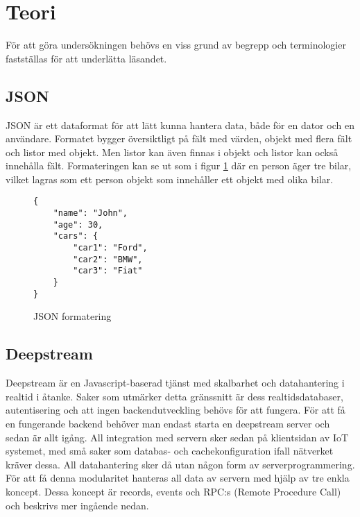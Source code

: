 \section{Teori}

\label{sec:tim-theory}
För att göra undersökningen behövs en viss grund av begrepp och terminologier fastställas för att underlätta läsandet.

\subsection{JSON}
JSON är ett dataformat för att lätt kunna hantera data, både för en dator och en användare.\cite{json} Formatet bygger översiktligt på fält med värden, objekt med flera fält och listor med objekt. Men listor kan även finnas i objekt och listor kan också innehålla fält. Formateringen kan se ut som i figur \ref{fig:tim-jsonformat} där en person äger tre bilar, vilket lagras som ett person objekt som innehåller ett objekt med olika bilar.

\lstset{language=Java}
\begin{figure}[h]
  \center
  \begin{minipage}[c]{5cm}
    \begin{lstlisting}
{
    "name": "John",
    "age": 30,
    "cars": {
        "car1": "Ford",
        "car2": "BMW",
        "car3": "Fiat"
    }
} 
    \end{lstlisting}
  \caption{JSON formatering}
  \label{fig:tim-jsonformat}
  \end{minipage}
\end{figure}

\subsection{Deepstream}
\label{subsec:tim-deepstream}
Deepstream är en Javascript-baserad tjänst med skalbarhet och datahantering i realtid i åtanke. Saker som utmärker detta gränssnitt är dess realtidsdatabaser, autentisering och att ingen backendutveckling behövs för att fungera. För att få en fungerande backend behöver man endast starta en deepstream server och sedan är allt igång. All integration med servern sker sedan på klientsidan av IoT systemet, med små saker som databas- och cachekonfiguration ifall nätverket kräver dessa. All datahantering sker då utan någon form av serverprogrammering. För att få denna modularitet hanteras all data av servern med hjälp av tre enkla koncept. Dessa koncept är records, events och RPC:s (Remote Procedure Call) och beskrivs mer ingående nedan. 


